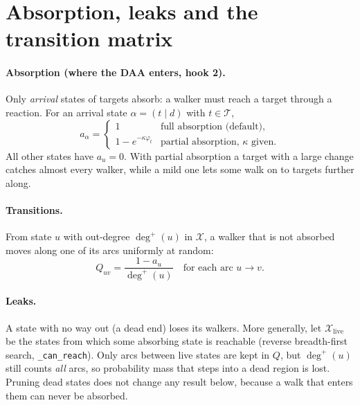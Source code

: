 \documentclass[11pt]{article}
\newcommand{\code}[1]{\texttt{#1}}
\newcommand{\Tset}{\mathcal{T}}
\newcommand{\X}{\mathcal{X}}
\begin{document}
\section{Absorption, leaks and the transition matrix}

\paragraph{Absorption (where the DAA enters, hook 2).} Only \emph{arrival} states of
targets absorb: a walker must reach a target through a reaction. For an arrival state
$\alpha=(t\mid d)$ with $t\in\Tset$,
\begin{equation}
  a_\alpha =
  \begin{cases}
    1 & \text{full absorption (default)},\\
    1-e^{-\kappa\varphi_t} & \text{partial absorption, } \kappa \text{ given}.
  \end{cases}
  \label{eq:absorb}
\end{equation}
All other states have $a_u=0$. With partial absorption a target with a large change
catches almost every walker, while a mild one lets some walk on to targets further along.

\paragraph{Transitions.} From state $u$ with out-degree $\deg^{+}(u)$ in $\X$, a
walker that is not absorbed moves along one of its arcs uniformly at random:
\begin{equation}
  Q_{uv} = \frac{1-a_u}{\deg^{+}(u)} \quad\text{for each arc } u\to v .
  \label{eq:Q}
\end{equation}

\paragraph{Leaks.} A state with no way out (a dead end) loses its walkers. More
generally, let $\X_{\mathrm{live}}$ be the states from which some absorbing state is
reachable (reverse breadth-first search, \code{\_can\_reach}). Only arcs between live
states are kept in $Q$, but $\deg^{+}(u)$ still counts \emph{all} arcs, so probability
mass that steps into a dead region is lost. Pruning dead states does not change any
result below, because a walk that enters them can never be absorbed.
\end{document}
